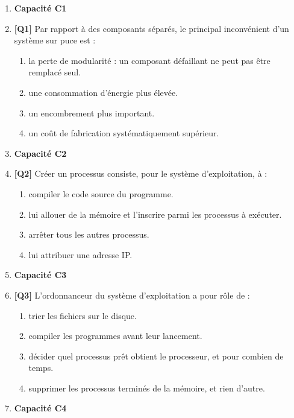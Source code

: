 \begin{enumerate}

\item[] \textbf{Capacité C1}

\item \textbf{[Q1]} Par rapport à des composants séparés, le principal inconvénient d'un système sur puce est :
  \begin{enumerate}[label=\Alph*.]
    \item la perte de modularité : un composant défaillant ne peut pas être remplacé seul.
    \item une consommation d'énergie plus élevée.
    \item un encombrement plus important.
    \item un coût de fabrication systématiquement supérieur.
  \end{enumerate}

\item[] \textbf{Capacité C2}

\item \textbf{[Q2]} Créer un processus consiste, pour le système d'exploitation, à :
  \begin{enumerate}[label=\Alph*.]
    \item compiler le code source du programme.
    \item lui allouer de la mémoire et l'inscrire parmi les processus à exécuter.
    \item arrêter tous les autres processus.
    \item lui attribuer une adresse IP.
  \end{enumerate}

\item[] \textbf{Capacité C3}

\item \textbf{[Q3]} L'ordonnanceur du système d'exploitation a pour rôle de :
  \begin{enumerate}[label=\Alph*.]
    \item trier les fichiers sur le disque.
    \item compiler les programmes avant leur lancement.
    \item décider quel processus prêt obtient le processeur, et pour combien de temps.
    \item supprimer les processus terminés de la mémoire, et rien d'autre.
  \end{enumerate}

\item[] \textbf{Capacité C4}


\end{enumerate}
